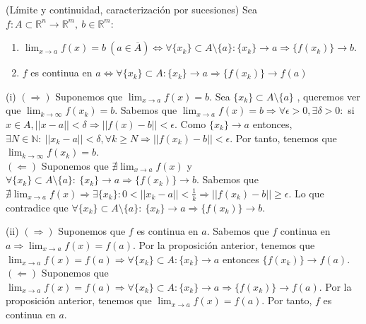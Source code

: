 \begin{prop}(Límite y continuidad, caracterización por sucesiones)
Sea $f:A\subset \mathbb{R}^n \rightarrow \mathbb{R}^m, \ b \in \mathbb{R}^m$:

\begin{enumerate}[label=(\roman*)]
    \item $\lim_{x\rightarrow a} f(x) = b \ (a \in \overline{A}) \Leftrightarrow \forall \{x_k\} \subset A\setminus\{a\}: \{x_k\} \rightarrow a \Rightarrow \{f(x_k)\} \rightarrow b$.
    \item $f$ es continua en $a \Leftrightarrow \forall \{x_k\} \subset A: \{x_k\} \rightarrow a \Rightarrow \{f(x_k)\} \rightarrow f(a)$
\end{enumerate}
\end{prop}
\begin{dem}(i)
    $(\Rightarrow)$ Suponemos que $\lim_{x\rightarrow a} f(x) = b$. Sea $\{ x_k \} \subset A\setminus \{a\}$ , queremos ver que $\lim_{k\rightarrow \infty} f(x_k) = b$. Sabemos que $\lim_{x\rightarrow a} f(x) = b \Rightarrow \forall \epsilon > 0, \exists \delta > 0:$ si $x\in A, ||x-a||<\delta \Rightarrow ||f(x) - b||< \epsilon$. Como $\{x_k\} \rightarrow a$ entonces, $ \exists N\in\mathbb{N}: \ ||x_k-a||<\delta, \forall k \geq N \Rightarrow ||f(x_k) - b||< \epsilon$. Por tanto, tenemos que $\lim_{k\rightarrow \infty} f(x_k) = b$.\\

    $(\Leftarrow)$  Suponemos que $\nexists\lim_{x\rightarrow a} f(x) $ y $ \forall \{x_k\} \subset A\setminus\{a\}: \ \{x_k\} \rightarrow a \Rightarrow \{f(x_k)\} \rightarrow b$. Sabemos que $\nexists\lim_{x\rightarrow a} f(x) \Rightarrow \exists \{x_k\}: 0<||x_k - a||<\frac{1}{k} \Rightarrow ||f(x_k) - b || \geq \epsilon$. Lo que contradice que $ \forall \{x_k\} \subset A\setminus\{a\}: \ \{x_k\} \rightarrow a \Rightarrow \{f(x_k)\} \rightarrow b$.
\end{dem}
\begin{dem}(ii)
    $(\Rightarrow)$ Suponemos que $f$ es continua en $a$. Sabemos que $f$ continua en $a \Rightarrow \lim_{x\rightarrow a} f(x) = f(a)$. Por la proposición anterior, tenemos que $\lim_{x\rightarrow a} f(x) = f(a) \Rightarrow \forall \{x_k\} \subset A: \{x_k\} \rightarrow a $ entonces $ \{f(x_k)\} \rightarrow f(a)$.\\

    $(\Leftarrow)$  Suponemos que $\lim_{x\rightarrow a} f(x) = f(a) \Rightarrow \forall \{x_k\} \subset A: \{x_k\} \rightarrow a \Rightarrow \{f(x_k)\} \rightarrow f(a)$. Por la proposición anterior, tenemos que $\lim_{x\rightarrow a} f(x) = f(a)$. Por tanto, $f$ es continua en $a$.
\end{dem}


